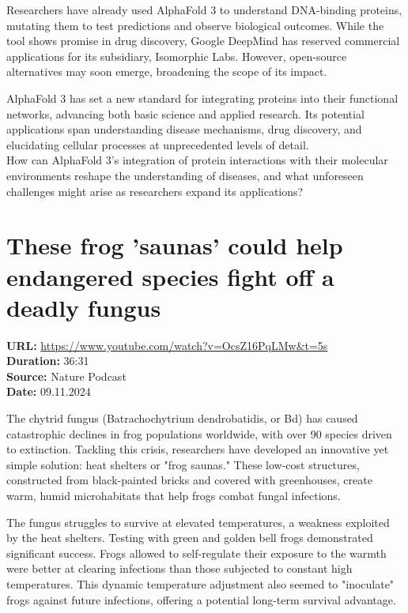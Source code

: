 \documentclass[12pt]{article}
\begin{document}
Researchers have already used AlphaFold 3 to understand DNA-binding proteins, mutating them to test predictions and observe biological outcomes. While the tool shows promise in drug discovery, Google DeepMind has reserved commercial applications for its subsidiary, Isomorphic Labs. However, open-source alternatives may soon emerge, broadening the scope of its impact.

AlphaFold 3 has set a new standard for integrating proteins into their functional networks, advancing both basic science and applied research. Its potential applications span understanding disease mechanisms, drug discovery, and elucidating cellular processes at unprecedented levels of detail.\\[5px]

How can AlphaFold 3's integration of protein interactions with their molecular environments reshape the understanding of diseases, and what unforeseen challenges might arise as researchers expand its applications?









\newpage

\section{These frog 'saunas’ could help endangered species fight off a deadly fungus}
\textbf{URL:} \url{https://www.youtube.com/watch?v=OcsZ16PqLMw&t=5s}\\
\textbf{Duration:} 36:31\\
\textbf{Source:} Nature Podcast\\
\textbf{Date:} 09.11.2024



The chytrid fungus (Batrachochytrium dendrobatidis, or Bd) has caused catastrophic declines in frog populations worldwide, with over 90 species driven to extinction. Tackling this crisis, researchers have developed an innovative yet simple solution: heat shelters or "frog saunas." These low-cost structures, constructed from black-painted bricks and covered with greenhouses, create warm, humid microhabitats that help frogs combat fungal infections.

The fungus struggles to survive at elevated temperatures, a weakness exploited by the heat shelters. Testing with green and golden bell frogs demonstrated significant success. Frogs allowed to self-regulate their exposure to the warmth were better at clearing infections than those subjected to constant high temperatures. This dynamic temperature adjustment also seemed to "inoculate" frogs against future infections, offering a potential long-term survival advantage.
\end{document}
